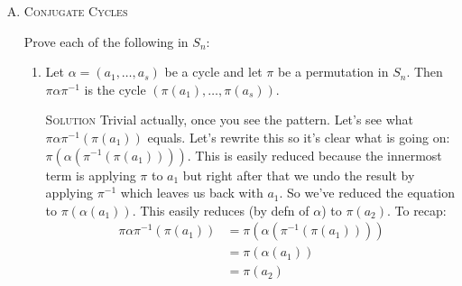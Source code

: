 \documentclass[twoside]{amsart}
\newcommand{\solution}{\textsc{Solution}\xspace}
\begin{document}
\begin{enumerate}[A.]
\begin{enumerate}[1]
      \item Find a transposition $\gamma$ such that $\alpha \beta \gamma$ is
      a cycle.

      \noindent \solution Choose some $a_i$ and some $b_j$ and let
      $\gamma = (a_ib_j)$. To illustrate let's set $\gamma = (a_1b_1)$.
      Then $\alpha \beta \gamma = b_1 a_2 a_3 \cdots a_s a_1 b_2 b_3
      \cdots b_r)$.

      \item Let $\gamma$ be the same transposition as in the preceeding 
      exercise. Show that $\alpha \gamma \beta$ and $\gamma \alpha \beta$
      are cycles.

      \noindent \solution $\alpha \gamma \beta =
      (a_1 a_2 \cdots a_s)(a_1b_1)(b_1 b_2 \cdots b_t)$ which can be
      expanded to $(a_1 b_1 b_2 \cdots b_t a_2 \cdots a_s)$.

      \noindent \solution $\gamma \alpha \beta = (a_1b_1)(a_1 a_2 \cdots a_s)
      (b_1 b_2 \cdots b_t)$ which can be expanded to 
      $(a_1 a_2 \cdots a_s b_1 b_2 \cdots b_t)$.

      \item Let $\alpha$ and $\beta$ be cycles of odd length (not disjoint).
      Prove that if $\alpha^2 = \beta^2$, then $\alpha = \beta$.

      \noindent \solution Trivial. Prove by contradiction. Assume 
      $\alpha \ne \beta$.

   \end{enumerate}

   \item \textsc{Conjugate Cycles}

   \noindent Prove each of the following in $S_n$:

   \begin{enumerate}[1]
       \item Let $\alpha = (a_1, \ldots , a_s)$ be a cycle and let $\pi$
       be a permutation in $S_n$. Then $\pi \alpha \pi^{-1}$ is the cycle
       $(\pi (a_1), \ldots , \pi (a_s))$.

       \noindent \solution Trivial actually, once you see the pattern.
       Let's see what $\pi \alpha \pi^{-1} (\pi(a_1))$ equals. Let's
       rewrite this so it's clear what is going on: 
       $\pi(\alpha(\pi^{-1}(\pi(a_1))))$. This is easily reduced because
       the innermost term is applying $\pi$ to $a_1$ but right after
       that we undo the result by applying $\pi^{-1}$ which leaves us
       back with $a_1$. So we've reduced the equation to $\pi(\alpha(a_1))$.
       This easily reduces (by defn of $\alpha$) to $\pi(a_2)$. To recap:
       \begin{align*}
           \pi \alpha \pi^{-1} (\pi(a_1)) &= \pi(\alpha(\pi^{-1}(\pi(a_1)))) \\
                   &= \pi(\alpha(a_1)) \\
                   &= \pi(a_2)
       \end{align*}


\end{enumerate}
\end{enumerate}
\end{document}
